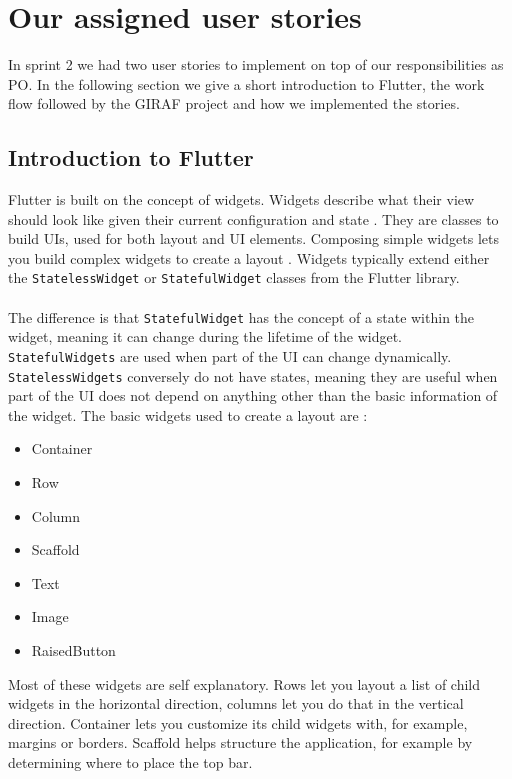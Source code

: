 \section{Our assigned user stories}
In sprint 2 we had two user stories to implement on top of our responsibilities as PO.
In the following section we give a short introduction to Flutter, the work flow followed by the GIRAF project and how we implemented the stories.

\subsection{Introduction to Flutter}
Flutter is built on the concept of widgets.
Widgets describe what their view should look like given their current configuration and state \cite{Flutterwidget}. 
They are classes to build UIs, used for both layout and UI elements.
Composing simple widgets lets you build complex widgets to create a layout \cite{Flutterlayout}.
Widgets typically extend either the \texttt{StatelessWidget} or \texttt{StatefulWidget} classes from the Flutter library.
\\\\
The difference is that \texttt{StatefulWidget} has the concept of a state within the widget, meaning it can change during the lifetime of the widget.
\texttt{StatefulWidgets} are used when part of the UI can change dynamically.
\texttt{StatelessWidgets} conversely do not have states, meaning they are useful when part of the UI does not depend on anything other than the basic information of the widget. 
The basic widgets used to create a layout are \cite{FlutterBasicWidgets}:
 \begin{itemize}
    \item Container
    \item Row
    \item Column  
    \item Scaffold
    \item Text
    \item Image
    \item RaisedButton 
 \end{itemize} 
Most of these widgets are self explanatory. 
Rows let you layout a list of child widgets in the horizontal direction, columns let you do that in the vertical direction.
Container lets you customize its child widgets with, for example, margins or borders.
Scaffold helps structure the application, for example by determining where to place the top bar.

